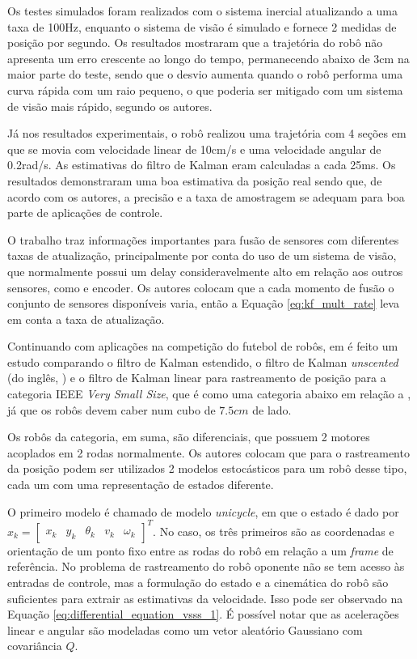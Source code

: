 \documentclass[acronym, symbols, table]{fei}
\begin{document}
Os testes simulados foram realizados com o sistema inercial atualizando a uma taxa de 100Hz, enquanto o sistema de visão é simulado e fornece 2 medidas de posição por segundo. Os resultados mostraram que a trajetória do robô não apresenta um erro crescente ao longo do tempo, permanecendo abaixo de 3cm na maior parte do teste, sendo que o desvio aumenta quando o robô performa uma curva rápida com um raio pequeno, o que poderia ser mitigado com um sistema de visão mais rápido, segundo os autores.

Já nos resultados experimentais, o robô realizou uma trajetória com 4 seções em que se movia com velocidade linear de 10cm/s e uma velocidade angular de 0.2rad/s. As estimativas do filtro de Kalman eram calculadas a cada 25ms. Os resultados demonstraram uma boa estimativa da posição real sendo que, de acordo com os autores, a precisão e a taxa de amostragem se adequam para boa parte de aplicações de controle.

O trabalho traz informações importantes para fusão de sensores com diferentes taxas de atualização, principalmente por conta do uso de um sistema de visão, que normalmente possui um delay consideravelmente alto em relação aos outros sensores, como  e encoder. Os autores colocam que a cada momento de fusão o conjunto de sensores disponíveis varia, então a Equação \ref{eq:kf_mult_rate} leva em conta a taxa de atualização.

Continuando com aplicações na competição do futebol de robôs, em \textcite{aguiar2017kalman} é feito um estudo comparando o filtro de Kalman estendido, o filtro de Kalman \textit{unscented} (do inglês, ) e o filtro de Kalman linear para rastreamento de posição para a categoria IEEE \textit{Very Small Size}, que é como uma categoria abaixo em relação a , já que os robôs devem caber num cubo de $7.5cm$ de lado.

Os robôs da categoria, em suma, são diferenciais, que possuem 2 motores acoplados em 2 rodas normalmente. Os autores colocam que para o rastreamento da posição podem ser utilizados 2 modelos estocásticos para um robô desse tipo, cada um com uma representação de estados diferente. 

O primeiro modelo é chamado de modelo \textit{unicycle}, em que o estado é dado por $x_k = \begin{bmatrix}
	x_k & y_k & \theta_k & v_k & \omega_k \end{bmatrix}^T$. No caso, os três primeiros são as coordenadas e orientação de um ponto fixo entre as rodas do robô em relação a um \textit{frame} de referência. No problema de rastreamento do robô oponente não se tem acesso às entradas de controle, mas a formulação do estado e a cinemática do robô são suficientes para extrair as estimativas da velocidade. Isso pode ser observado na Equação \ref{eq:differential_equation_vsss_1}. É possível notar que as acelerações linear e angular são modeladas como um vetor aleatório Gaussiano com covariância $Q$.
\end{document}

